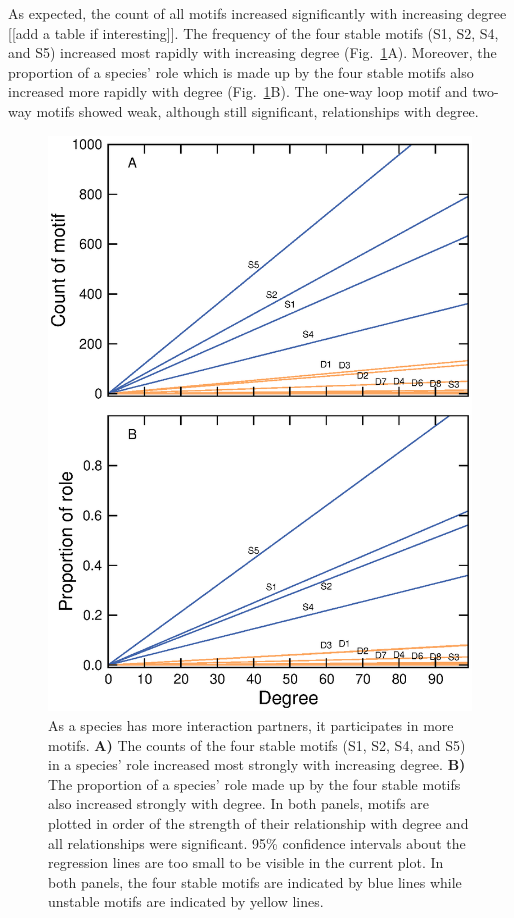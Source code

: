 \documentclass[12pt]{article}
\begin{document}
		As expected, the count of all motifs increased significantly with increasing degree [[add a table if interesting]].
		The frequency of the four stable motifs (S1, S2, S4, and S5) increased most rapidly with increasing degree (Fig.~\ref{motif_vs_degree}A).
		Moreover, the proportion of a species' role which is made up by the four stable motifs also increased more rapidly with degree (Fig.~\ref{motif_vs_degree}B).
		The one-way loop motif and two-way motifs showed weak, although still significant, relationships with degree.


		\begin{figure}[hb!]
			\caption{As a species has more interaction partners, it participates in more motifs. \textbf{A)} The counts of the four stable motifs (S1, S2, S4, and S5) in a species' role increased most strongly with increasing degree. \textbf{B)} The proportion of a species' role made up by the four stable motifs also increased strongly with degree. In both panels, motifs are plotted in order of the strength of their relationship with degree and all relationships were significant. 95\% confidence intervals about the regression lines are too small to be visible in the current plot. In both panels, the four stable motifs are indicated by blue lines while unstable motifs are indicated by yellow lines.}
			\label{motif_vs_degree}
			\includegraphics[width=.75\textwidth]{figures/roles/motif_vs_degree.eps}
			\end{figure}
\end{document}
